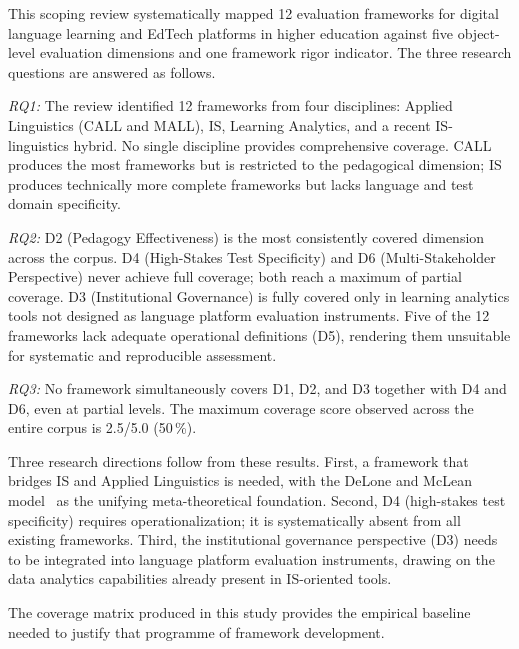\documentclass[conference]{IEEEtran}
\begin{document}
This scoping review systematically mapped 12 evaluation frameworks for
digital language learning and EdTech platforms in higher education
against five object-level evaluation dimensions and one framework
rigor indicator. The three research questions are answered as follows.

\textit{RQ1:} The review identified 12 frameworks from four
disciplines: Applied Linguistics (CALL and MALL), IS, Learning
Analytics, and a recent IS-linguistics hybrid. No single discipline
provides comprehensive coverage. CALL produces the most frameworks but
is restricted to the pedagogical dimension; IS produces technically
more complete frameworks but lacks language and test domain
specificity.

\textit{RQ2:} D2 (Pedagogy Effectiveness) is the most consistently
covered dimension across the corpus. D4 (High-Stakes Test Specificity)
and D6 (Multi-Stakeholder Perspective) never achieve full coverage;
both reach a maximum of partial coverage. D3 (Institutional
Governance) is fully covered only in learning analytics tools not
designed as language platform evaluation instruments. Five of the
12 frameworks lack adequate operational definitions (D5), rendering
them unsuitable for systematic and reproducible assessment.

\textit{RQ3:} No framework simultaneously covers D1, D2, and D3
together with D4 and D6, even at partial levels. The maximum coverage
score observed across the entire corpus is 2.5/5.0 (50\,\%).

Three research directions follow from these results. First, a
framework that bridges IS and Applied Linguistics is needed, with the
DeLone and McLean model~\cite{b10} as the unifying meta-theoretical
foundation. Second, D4 (high-stakes test specificity) requires
operationalization; it is systematically absent from all existing
frameworks. Third, the institutional governance perspective (D3) needs
to be integrated into language platform evaluation instruments, drawing
on the data analytics capabilities already present in IS-oriented
tools.

The coverage matrix produced in this study provides the empirical
baseline needed to justify that programme of framework development.
\end{document}
